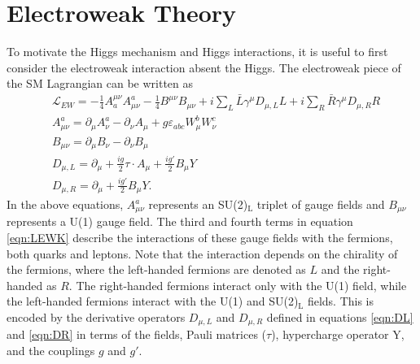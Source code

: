 \section{Electroweak Theory}
To motivate the Higgs mechanism and Higgs interactions, it is useful to first consider the electroweak interaction absent the Higgs. The electroweak piece of the 
SM Lagrangian can be written as 
\begin{align}
	& \mathcal{L}_{EW} = -\frac{1}{4}A_a^{\mu\nu}A^a_{\mu\nu} - \frac{1}{4}B^{\mu\nu}B_{\mu\nu} + i\sum_L \bar{L}\gamma^{\mu}D_{\mu,L}L + i\sum_R \bar{R}\gamma^{\mu}D_{\mu,R}R \label{eqn:LEWK}\\
	& A^a_{\mu\nu} = \partial_{\mu}A_{\nu}^{a} - \partial_{\nu}A_{\mu} + g\varepsilon_{abc}W^{b}_{\mu}W^{c}_{\nu} \\
	& B_{\mu\nu} = \partial_{\mu}B_{\nu} - \partial_{\nu}B_{\mu} \\
	& D_{\mu,L} = \partial_{\mu} + \frac{ig}{2}\tau\cdot A_{\mu} + \frac{ig'}{2}B_{\mu}Y \label{eqn:DL}\\
	& D_{\mu,R} = \partial_{\mu} + \frac{ig'}{2}B_{\mu}Y. \label{eqn:DR}
\end{align}
In the above equations, $A_{\mu\nu}^a$ represents an SU(2)$_{\mathrm{L}}$ triplet of gauge fields and $B_{\mu\nu}$ represents a U(1) gauge field. The third and fourth terms in equation \ref{eqn:LEWK} 
describe the interactions of these gauge fields with the fermions, both quarks and leptons. Note that the interaction depends on the chirality of the fermions, where the left-handed 
fermions are denoted as $L$ and the right-handed as $R$. The right-handed fermions interact only with the U(1) field, while the left-handed fermions interact with the U(1) and SU(2)$_{\mathrm{L}}$ fields. 
This is encoded by the derivative operators $D_{\mu,L}$ and $D_{\mu,R}$ defined in equations \ref{eqn:DL} and \ref{eqn:DR} in terms of the fields, Pauli matrices ($\tau$), hypercharge operator Y, and the couplings $g$ and $g'$. 

